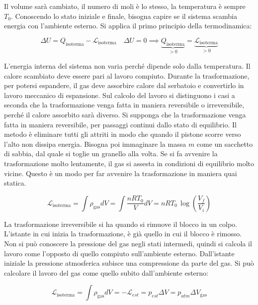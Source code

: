 \begin{figure}[htpb]
\end{figure}
\FloatBarrier
Il volume sarà cambiato, il numero di moli è lo stesso, la temperatura è sempre $T_0$. Conoscendo lo stato iniziale e finale, bisogna capire se il sistema scambia energia con l'ambiente esterno. Si applica il primo principio della termodinamica:

\[
	\Delta U = Q_{\text{isoterma} }- \mathcal{L}_{\text{isoterma} } \quad \Delta U = 0 \implies \underbrace{Q_{\text{isoterma} }}_{>0} = \underbrace{\mathcal{L}_{\text{isoterma} }}_{>0}
\]

L'energia interna del sistema non varia perché dipende solo dalla temperatura. Il calore scambiato deve essere pari al lavoro compiuto. Durante la trasformazione, per potersi espandere, il gas deve assorbire calore dal serbatoio e convertirlo in lavoro meccanico di espansione. Sul calcolo del lavoro si distinguono i casi a seconda che la trasformazione venga fatta in maniera reversibile o irreversibile, perché il calore assorbito sarà diverso.
Si supponga che la trasformazione venga fatta in maniera reversibile, per passaggi continui dallo stato di equilibrio. Il metodo è eliminare tutti gli attriti in modo che quando il pistone scorre verso l'alto non dissipa energia. Bisogna poi immaginare la massa $m$ come un sacchetto di sabbia, dal quale si toglie un granello alla volta. Se si fa avvenire la trasformazione molto lentamente, il gas si assesta in condizioni di equilibrio molto vicine. Questo è un modo per far avvenire la trasformazione in maniera quai statica.

\[
	\mathcal{L}_{\text{isoterma} }= \int\rho_{\text{gas} }dV = \int \frac{nRT_0 }{V}dV = nRT_0\,\log \left( \frac{V_f}{V_i} \right)
\]

La trasformazione irreversibile si ha quando si rimuove il blocco in un colpo. L'istante in cui inizia la trasformazione, è già quello in cui il blocco è rimosso. Non si può conoscere la pressione del gas negli stati intermedi, quindi si calcola il lavoro come l'opposto di quello compiuto sull'ambiente esterno. Dall'istante iniziale la pressione atmosferica subisce una compressione da parte del gas. Si può calcolare il lavoro del gas come quello subito dall'ambiente esterno:

\[
	\mathcal{L}_{\text{isoterma} } =\int \rho_{\text{gas} }dV = -\mathcal{L}_{est} = p_{est}\Delta V = p_{atm}\Delta V_{\text{gas} }    	
\]

